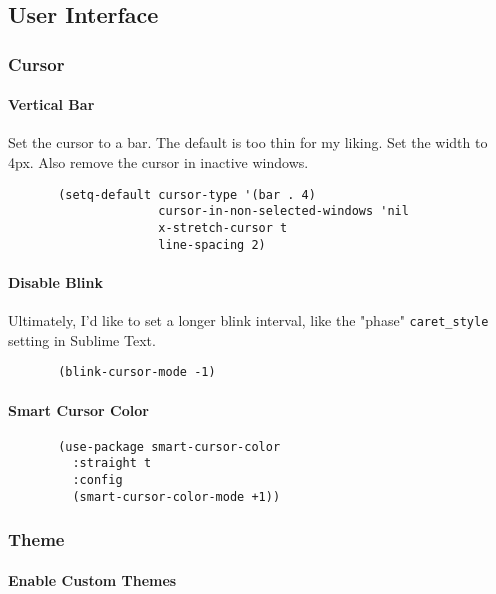 \documentclass[11pt]{article}
\begin{document}
\subsection*{User Interface}
\label{sec:org0829b8c}
\subsubsection*{Cursor}
\label{sec:org4195e0a}
\paragraph*{Vertical Bar}
\label{sec:org87fb0b8}

Set the cursor to a bar. The default is too thin for my liking.
Set the width to 4px. Also remove the cursor in inactive windows.

\begin{verbatim}
       (setq-default cursor-type '(bar . 4)
                     cursor-in-non-selected-windows 'nil
                     x-stretch-cursor t
                     line-spacing 2)
\end{verbatim}

\paragraph*{Disable Blink}
\label{sec:org87498db}

Ultimately, I'd like to set a longer blink interval, like the "phase"
\texttt{caret\_style} setting in Sublime Text.

\begin{verbatim}
       (blink-cursor-mode -1)
\end{verbatim}

\paragraph*{Smart Cursor Color}
\label{sec:orgf351920}

\begin{verbatim}
       (use-package smart-cursor-color
         :straight t
         :config
         (smart-cursor-color-mode +1))
\end{verbatim}

\subsubsection*{Theme}
\label{sec:org7dc16f0}
\paragraph*{Enable Custom Themes}
\label{sec:org8815990}
\end{document}
